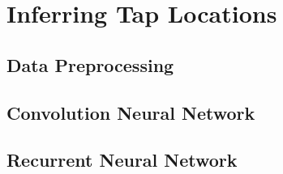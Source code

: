 \chapter{Inferring Tap Locations \label{cha:chapter4}}

\section{Data Preprocessing}
\section{Convolution Neural Network}
\section{Recurrent Neural Network}